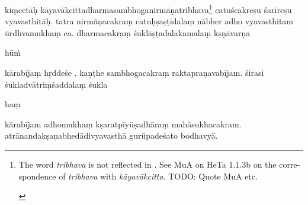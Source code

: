 \documentclass[naipra.tex]{subfiles}
\begin{document}
\begin{sanskrit}


\pstart
kiṃcetāḥ kāyavākcittadharmasambhoganirmāṇatribhava\footnote{\begin{english}
	The word \emph{tribhava} is not reflected in \TIB .
	See MuA on HeTa 1.1.3b on the correspondence of \emph{tribhava} with \emph{kāyavākcitta}.
	TODO: Quote MuA etc.
\end{english}} catuścakreṣu śarīreṣu vyavasthitāḥ. 
tatra nirmāṇacakraṃ  catuḥṣaṣṭidalaṃ  nābher adho vyavasthitam ūrdhvamukhaṃ ca.
dharmacakraṃ śuklāṣṭadalakamalaṃ kṣṇāvarṇa\dsh \begin{mantra}hūṁ\end{mantra}\dsh kārabījaṃ hṛddeśe . 
kaṇṭhe sambhogacakraṃ  raktapraṇavabījam.
śirasi śukladvātriṃśaddalaṃ śukla\dsh \begin{mantra}haṃ\end{mantra}\dsh kārabījam adhomukhaṃ kṣaratpīyūṣadhāraṃ mahāsukhacakram. 
atrānandakṣaṇabhedādivyavasthā gurūpadeśato bodhavyā.
\pend




\end{sanskrit}
\end{document}
